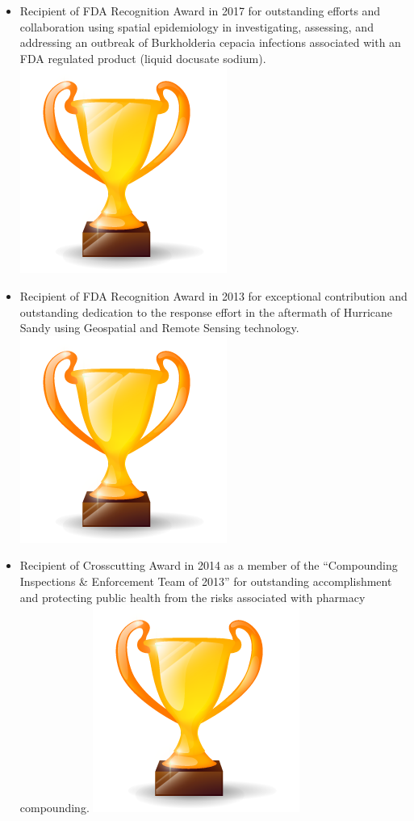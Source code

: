\documentclass[letterpaper]{twentysecondcv} %
\begin{document}
\begin{twenty}
{{\begin{itemize}
\vspace{1mm}
   \item Recipient of FDA Recognition Award in 2017 for outstanding efforts and collaboration using spatial epidemiology in investigating, assessing, and addressing an outbreak of Burkholderia cepacia infections associated with an FDA regulated product (liquid docusate sodium).\includegraphics[scale=0.05]{img/trophy.png}
\vspace{1mm}

        
        \item	Recipient of FDA Recognition Award in 2013 for exceptional contribution and outstanding dedication to the response effort in the aftermath of Hurricane Sandy using Geospatial and Remote Sensing technology.    \includegraphics[scale=0.05]{img/trophy.png}
\vspace{1mm}

        \item	Recipient of Crosscutting Award in 2014 as a member of the “Compounding Inspections \& Enforcement Team of 2013” for outstanding accomplishment and protecting public health from the risks associated with pharmacy compounding. \includegraphics[scale=0.05]{img/trophy.png}
\vspace{1mm}


\end{itemize}}}
\end{twenty}
\end{document}
